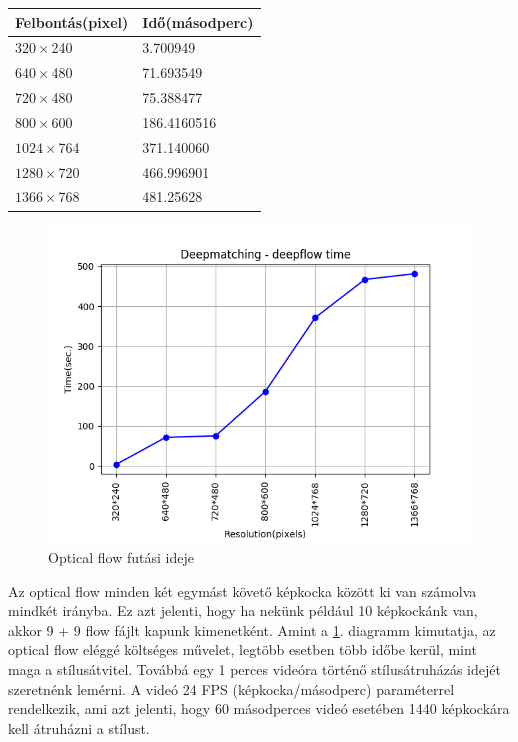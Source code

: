 \documentclass[12pt, a4paper, oneside]{book}
\theoremstyle{tetel}
\begin{document}
\begin{center}
	\begin{tabular}{ | l | l |}
		\hline
		Felbontás(pixel) & Idő(másodperc) \\ \hline
		$320 \times $240 & 3.700949 \\ \hline
		$640 \times $480 & 71.693549 \\ \hline
		$720 \times $480 & 75.388477 \\ \hline
		$800 \times $600 & 186.4160516 \\ \hline
		$1024 \times $764 & 371.140060 \\ \hline
		$1280 \times $720 & 466.996901 \\ \hline
		$1366 \times $768 & 481.25628 \\ \hline
	\end{tabular}
\end{center}

\begin{figure}[!htbp]
\begin{center}
	\includegraphics[scale=0.8]{deepmatching_deeplfow.png}
	\caption{Optical flow futási ideje}
	\label{deepmatching_deepflow}
\end{center}
\end{figure}

Az optical flow minden két egymást követő képkocka között ki van számolva mindkét irányba. Ez azt jelenti, hogy ha nekünk például 10 képkockánk van, akkor 9 + 9 flow fájlt kapunk kimenetként. Amint a \ref{deepmatching_deepflow}. diagramm kimutatja, az optical flow eléggé költséges művelet, legtöbb esetben több időbe kerül, mint maga a stílusátvitel. 
\newline
\indent
Továbbá egy 1 perces videóra történő stílusátruházás idejét szeretnénk lemérni. A videó 24 FPS (képkocka/másodperc) paraméterrel rendelkezik, ami azt jelenti, hogy 60 másodperces videó esetében 1440 képkockára kell átruházni a stílust.
\end{document}
